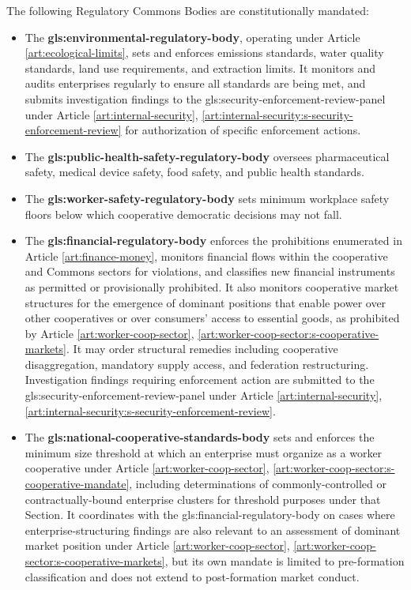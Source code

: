 The following Regulatory Commons Bodies are constitutionally mandated:
\begin{itemize}
    \item The \textbf{\gls{gls:environmental-regulatory-body}}, operating under Article \ref{art:ecological-limits}, sets and enforces emissions standards, water quality standards, land use requirements, and extraction limits. It monitors and audits enterprises regularly to ensure all standards are being met, and submits investigation findings to the \gls{gls:security-enforcement-review-panel} under Article \ref{art:internal-security}, \ref{art:internal-security:s-security-enforcement-review} for authorization of specific enforcement actions.

    \item The \textbf{\gls{gls:public-health-safety-regulatory-body}} oversees pharmaceutical safety, medical device safety, food safety, and public health standards.

    \item The \textbf{\gls{gls:worker-safety-regulatory-body}} sets minimum workplace safety floors below which cooperative democratic decisions may not fall.

    \item The \textbf{\gls{gls:financial-regulatory-body}} enforces the prohibitions enumerated in Article \ref{art:finance-money}, monitors financial flows within the cooperative and Commons sectors for violations, and classifies new financial instruments as permitted or provisionally prohibited. It also monitors cooperative market structures for the emergence of dominant positions that enable power over other cooperatives or over consumers' access to essential goods, as prohibited by Article \ref{art:worker-coop-sector}, \ref{art:worker-coop-sector:s-cooperative-markets}. It may order structural remedies including cooperative disaggregation, mandatory supply access, and federation restructuring. Investigation findings requiring enforcement action are submitted to the \gls{gls:security-enforcement-review-panel} under Article \ref{art:internal-security}, \ref{art:internal-security:s-security-enforcement-review}.

    \item The \textbf{\gls{gls:national-cooperative-standards-body}} sets and enforces the minimum size threshold at which an enterprise must organize as a worker cooperative under Article \ref{art:worker-coop-sector}, \ref{art:worker-coop-sector:s-cooperative-mandate}, including determinations of commonly-controlled or contractually-bound enterprise clusters for threshold purposes under that Section. It coordinates with the \gls{gls:financial-regulatory-body} on cases where enterprise-structuring findings are also relevant to an assessment of dominant market position under Article \ref{art:worker-coop-sector}, \ref{art:worker-coop-sector:s-cooperative-markets}, but its own mandate is limited to pre-formation classification and does not extend to post-formation market conduct.
\end{itemize}

